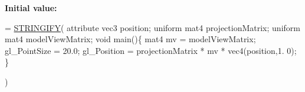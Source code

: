 {\bfseries Initial value\+:}
\begin{DoxyCode}
= \mbox{\hyperlink{_a_r_shaders_8h_ab06e1eb2e9bf38e0d452b1f796aed208}{STRINGIFY}}(
                                                 attribute vec3 position;
                                                 uniform mat4 projectionMatrix;
                                                 uniform mat4 modelViewMatrix;
                                                 \textcolor{keywordtype}{void} main()\{
                                                     mat4 mv = modelViewMatrix;
                                                     gl\_PointSize = 20.0;
                                                     gl\_Position = projectionMatrix * mv * vec4(position,1.
      0);
                                                 \}
                                                 
                                                 )
\end{DoxyCode}

